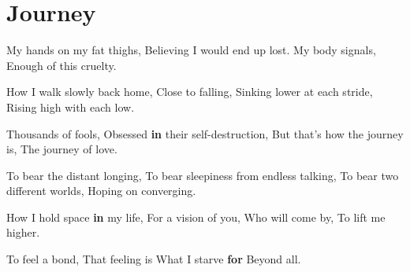 \documentclass[
]{book}
\newenvironment{Shaded}{\begin{snugshade}}{\end{snugshade}}
\newcommand{\ControlFlowTok}[1]{\textcolor[rgb]{0.13,0.29,0.53}{\textbf{#1}}}
\newcommand{\NormalTok}[1]{#1}
\newcommand{\SpecialCharTok}[1]{\textcolor[rgb]{0.00,0.00,0.00}{#1}}
\begin{document}
\hypertarget{journey}{%
\chapter{Journey}\label{journey}}

\begin{Shaded}
\begin{Highlighting}[]
\NormalTok{My hands on my fat thighs,}
\NormalTok{Believing I would end up lost.}
\NormalTok{My body signals,}
\NormalTok{Enough of this cruelty.}

\NormalTok{How I walk slowly back home,}
\NormalTok{Close to falling,}
\NormalTok{Sinking lower at each stride,}
\NormalTok{Rising high with each low.}

\NormalTok{Thousands of fools,}
\NormalTok{Obsessed }\ControlFlowTok{in}\NormalTok{ their self}\SpecialCharTok{{-}}\NormalTok{destruction,}
\NormalTok{But that’s how the journey is,}
\NormalTok{The journey of love.}

\NormalTok{To bear the distant longing,}
\NormalTok{To bear sleepiness from endless talking,}
\NormalTok{To bear two different worlds,}
\NormalTok{Hoping on converging.}

\NormalTok{How I hold space }\ControlFlowTok{in}\NormalTok{ my life,}
\NormalTok{For a vision of you,}
\NormalTok{Who will come by,}
\NormalTok{To lift me higher.}

\NormalTok{To feel a bond,}
\NormalTok{That feeling is }
\NormalTok{What I starve }\ControlFlowTok{for}
\NormalTok{Beyond all.}
\end{Highlighting}
\end{Shaded}
\end{document}
